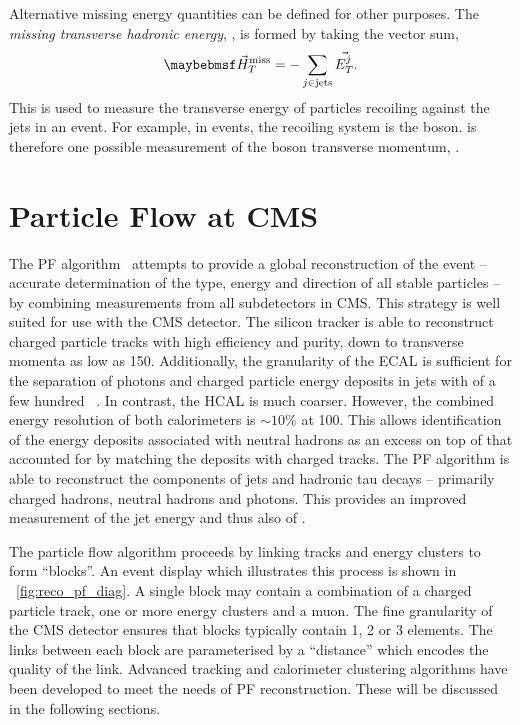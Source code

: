 Alternative missing energy quantities can be defined for other purposes. The
\emph{missing transverse hadronic energy}, \MHT, is formed by taking the vector
sum,
\begin{equation*}
\MHTv = -\sum_{j \in \textrm{jets}} \vec{E_T^j}.
\end{equation*}
This is used to measure the transverse energy of particles recoiling against the
jets in an event. For example, in \Wjets events, the recoiling system is the \PW
boson. \MHTv is therefore one possible measurement of the \PW boson transverse
momentum, \PtWv.


\section{Particle Flow at \ac{CMS}}
\label{sec:reco_pf}
The \ac{PF} algorithm~\cite{cms_pf_pas,cms_pf_pas2} attempts to provide a
global reconstruction of the event -- accurate determination of the type, energy
and direction of all stable particles -- by combining measurements from all
subdetectors in \ac{CMS}. This strategy is well suited for use with the \ac{CMS}
detector. The silicon tracker is able to reconstruct charged particle tracks
with high efficiency and purity, down to transverse momenta as low as
\unit{150}{\MeV}. Additionally, the granularity of the \ac{ECAL} is sufficient
for the separation of photons and charged particle energy deposits in jets with
\Pt of a few hundred \GeV~\cite{cms_pf_pas}. In contrast, the \ac{HCAL} is much
coarser. However, the combined energy resolution of both calorimeters is $\sim
10\%$ at \unit{100}{\GeV}. This allows identification of the energy deposits
associated with neutral hadrons as an excess on top of that accounted for by
matching the deposits with charged tracks. The \ac{PF} algorithm is able to
reconstruct the components of jets and hadronic tau decays -- primarily charged
hadrons, neutral hadrons and photons. This provides an improved measurement of
the jet energy and thus also of \METv.

The particle flow algorithm proceeds by linking tracks and energy clusters to
form ``blocks''. An event display which illustrates this process is shown in
\fig~\ref{fig:reco_pf_diag}. A single block may contain a combination of a
charged particle track, one or more energy clusters and a muon. The fine
granularity of the \ac{CMS} detector ensures that blocks typically contain 1, 2
or 3 elements.  The links between each block are parameterised by a ``distance''
which encodes the quality of the link. Advanced tracking and calorimeter
clustering algorithms have been developed to meet the needs of \ac{PF}
reconstruction. These will be discussed in the following sections.

